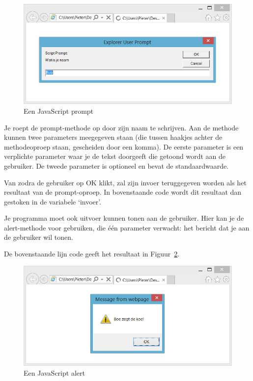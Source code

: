\begin{figure}
\centering
\includegraphics[scale=0.8]{JavaScript/prompt.png}
\caption{Een JavaScript prompt}\label{fig:prompt}
\end{figure}

Je roept de prompt-methode op door zijn naam te schrijven. Aan de methode kunnen twee parameters meegegeven staan (die tussen haakjes achter de methodeoproep staan, gescheiden door een komma). De eerste parameter is een verplichte parameter waar je de tekst doorgeeft die getoond wordt aan de gebruiker. De tweede parameter is optioneel en bevat de standaardwaarde.

Van zodra de gebruiker op OK klikt, zal zijn invoer teruggegeven worden als het resultaat van de prompt-oproep. In bovenstaande code wordt dit resultaat dan gestoken in de variabele `invoer'.

Je programma moet ook uitvoer kunnen tonen aan de gebruiker. Hier kan je de alert-methode voor gebruiken, die \'e\'en parameter verwacht: het bericht dat je aan de gebruiker wil tonen.


De bovenstaande lijn code geeft het resultaat in Figuur~\ref{fig:alert}.

\begin{figure}
\centering
\includegraphics[scale=0.8]{JavaScript/alert.png}
\caption{Een JavaScript alert}\label{fig:alert}
\end{figure}


